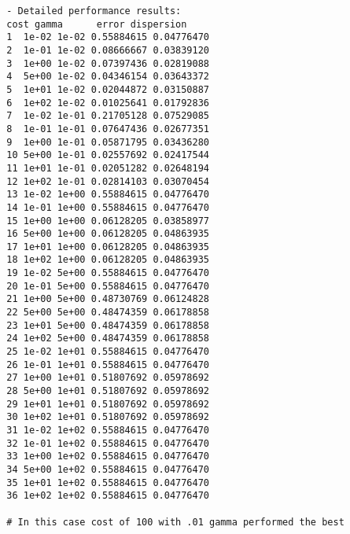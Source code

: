\documentclass{article}
\begin{document}
\begin{verbatim}
		- Detailed performance results:
		cost gamma      error dispersion
		1  1e-02 1e-02 0.55884615 0.04776470
		2  1e-01 1e-02 0.08666667 0.03839120
		3  1e+00 1e-02 0.07397436 0.02819088
		4  5e+00 1e-02 0.04346154 0.03643372
		5  1e+01 1e-02 0.02044872 0.03150887
		6  1e+02 1e-02 0.01025641 0.01792836
		7  1e-02 1e-01 0.21705128 0.07529085
		8  1e-01 1e-01 0.07647436 0.02677351
		9  1e+00 1e-01 0.05871795 0.03436280
		10 5e+00 1e-01 0.02557692 0.02417544
		11 1e+01 1e-01 0.02051282 0.02648194
		12 1e+02 1e-01 0.02814103 0.03070454
		13 1e-02 1e+00 0.55884615 0.04776470
		14 1e-01 1e+00 0.55884615 0.04776470
		15 1e+00 1e+00 0.06128205 0.03858977
		16 5e+00 1e+00 0.06128205 0.04863935
		17 1e+01 1e+00 0.06128205 0.04863935
		18 1e+02 1e+00 0.06128205 0.04863935
		19 1e-02 5e+00 0.55884615 0.04776470
		20 1e-01 5e+00 0.55884615 0.04776470
		21 1e+00 5e+00 0.48730769 0.06124828
		22 5e+00 5e+00 0.48474359 0.06178858
		23 1e+01 5e+00 0.48474359 0.06178858
		24 1e+02 5e+00 0.48474359 0.06178858
		25 1e-02 1e+01 0.55884615 0.04776470
		26 1e-01 1e+01 0.55884615 0.04776470
		27 1e+00 1e+01 0.51807692 0.05978692
		28 5e+00 1e+01 0.51807692 0.05978692
		29 1e+01 1e+01 0.51807692 0.05978692
		30 1e+02 1e+01 0.51807692 0.05978692
		31 1e-02 1e+02 0.55884615 0.04776470
		32 1e-01 1e+02 0.55884615 0.04776470
		33 1e+00 1e+02 0.55884615 0.04776470
		34 5e+00 1e+02 0.55884615 0.04776470
		35 1e+01 1e+02 0.55884615 0.04776470
		36 1e+02 1e+02 0.55884615 0.04776470
		
		# In this case cost of 100 with .01 gamma performed the best
	\end{verbatim}	
	
\end{document}
